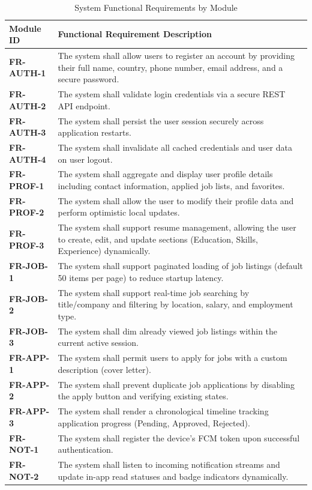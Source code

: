 \begin{table}[htbp]
\centering
\caption{System Functional Requirements by Module}
\label{tab:functional_requirements}
\begin{tabular}{|l|p{10cm}|}
\hline
\textbf{Module ID} & \textbf{Functional Requirement Description} \\ \hline
\textbf{FR-AUTH-1} & The system shall allow users to register an account by providing their full name, country, phone number, email address, and a secure password. \\ \hline
\textbf{FR-AUTH-2} & The system shall validate login credentials via a secure REST API endpoint. \\ \hline
\textbf{FR-AUTH-3} & The system shall persist the user session securely across application restarts. \\ \hline
\textbf{FR-AUTH-4} & The system shall invalidate all cached credentials and user data on user logout. \\ \hline
\textbf{FR-PROF-1} & The system shall aggregate and display user profile details including contact information, applied job lists, and favorites. \\ \hline
\textbf{FR-PROF-2} & The system shall allow the user to modify their profile data and perform optimistic local updates. \\ \hline
\textbf{FR-PROF-3} & The system shall support resume management, allowing the user to create, edit, and update sections (Education, Skills, Experience) dynamically. \\ \hline
\textbf{FR-JOB-1}  & The system shall support paginated loading of job listings (default 50 items per page) to reduce startup latency. \\ \hline
\textbf{FR-JOB-2}  & The system shall support real-time job searching by title/company and filtering by location, salary, and employment type. \\ \hline
\textbf{FR-JOB-3}  & The system shall dim already viewed job listings within the current active session. \\ \hline
\textbf{FR-APP-1}  & The system shall permit users to apply for jobs with a custom description (cover letter). \\ \hline
\textbf{FR-APP-2}  & The system shall prevent duplicate job applications by disabling the apply button and verifying existing states. \\ \hline
\textbf{FR-APP-3}  & The system shall render a chronological timeline tracking application progress (Pending, Approved, Rejected). \\ \hline
\textbf{FR-NOT-1}  & The system shall register the device's FCM token upon successful authentication. \\ \hline
\textbf{FR-NOT-2}  & The system shall listen to incoming notification streams and update in-app read statuses and badge indicators dynamically. \\ \hline
\end{tabular}
\end{table}

